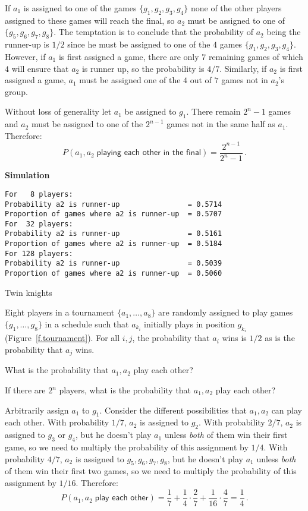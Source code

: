 \solution{}

If $a_1$ is assigned to one of the games $\{g_1,g_2,g_3,g_4\}$ none of the other players assigned to these games will reach the final, so $a_2$ must be assigned to one of $\{g_5,g_6,g_7,g_8\}$. The temptation is to conclude that the probability of $a_2$ being the runner-up is $1/2$ since he must be assigned to one of the $4$ games $\{g_1,g_2,g_3,g_4\}$. However, if $a_1$ is first assigned a game, there are only $7$ remaining games of which $4$ will ensure that $a_2$ is runner up, so the probability is $4/7$. Similarly, if $a_2$ is first assigned a game, $a_1$ must be assigned one of the $4$ out of $7$ games not in $a_2$'s group.

 Without loss of generality let $a_1$ be assigned to $g_1$. There remain $2^n-1$ games and $a_2$ must be assigned to one of the $2^{n-1}$ games not in the same half as $a_1$. Therefore:
\[
P(a_1,a_2\;\textsf{playing each other in the final})=\frac{2^{n-1}}{2^n-1}\,.
\]

\textbf{Simulation}
\begin{verbatim}
For   8 players:
Probability a2 is runner-up                = 0.5714
Proportion of games where a2 is runner-up  = 0.5707
For  32 players:
Probability a2 is runner-up                = 0.5161
Proportion of games where a2 is runner-up  = 0.5184
For 128 players:
Probability a2 is runner-up                = 0.5039
Proportion of games where a2 is runner-up  = 0.5060
\end{verbatim}


\begin{prob}{Twin knights}

Eight players in a tournament $\{a_1,\ldots,a_8\}$ are randomly assigned to play games $\{g_1,\ldots,g_8\}$ in a schedule such that $a_{k_{i}}$ initially plays in position $g_{k_{i}}$ (Figure~\ref{f.tournament}). For all $i,j$, the probability that $a_i$ wins is $1/2$ as is the probability that $a_j$ wins.

 What is the probability that $a_1,a_2$ play each other?

 If there are $2^n$ players, what is the probability that $a_1,a_2$ play each other?
\end{prob}

\solution{}

 Arbitrarily assign $a_1$ to $g_1$. Consider the different possibilities that $a_1,a_2$ can play each other. With probability $1/7$, $a_2$ is assigned to $g_2$. With probability $2/7$, $a_2$ is assigned to $g_3$ or $g_4$, but he doesn't play $a_1$ unless \emph{both} of them win their first game, so we need to multiply the probability of this assignment by $1/4$. With probability $4/7$, $a_2$ is assigned to $g_5,g_6,g_7,g_8$, but he doesn't play $a_1$ unless \emph{both} of them win their first two  games, so we need to multiply the probability of this assignment by $1/16$. Therefore:
\[
P(a_1, a_2\;\textsf{play each other})=\frac{1}{7} + \frac{1}{4}\cdot \frac{2}{7} + \frac{1}{16}\cdot \frac{4}{7} =\frac{1}{4}\,.
\]

